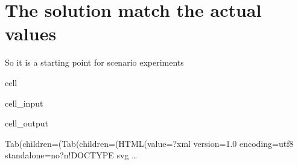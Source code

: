 \documentclass[letterpaper,10pt,english]{jupyterBook}
\begin{document}
\section{The solution match the actual values}
\label{\detokenize{content/howto/smallmodel/modelstart:the-solution-match-the-actual-values}}
\sphinxAtStartPar
So it is a starting point for scenario experiments

\begin{sphinxuseclass}{cell}\begin{sphinxVerbatimInput}

\begin{sphinxuseclass}{cell_input}
\begin{sphinxVerbatim}[commandchars=\\\{\}]
\PYG{p}{[}\PYG{p}{]} 
\end{sphinxVerbatim}

\end{sphinxuseclass}\end{sphinxVerbatimInput}
\begin{sphinxVerbatimOutput}

\begin{sphinxuseclass}{cell_output}
\begin{sphinxVerbatim}[commandchars=\\\{\}]
Tab(children=(Tab(children=(HTML(value=\PYGZsq{}\PYGZlt{}?xml version=\PYGZdq{}1.0\PYGZdq{} encoding=\PYGZdq{}utf\PYGZhy{}8\PYGZdq{} standalone=\PYGZdq{}no\PYGZdq{}?\PYGZgt{}\PYGZbs{}n\PYGZlt{}!DOCTYPE svg …
\end{sphinxVerbatim}

\begin{sphinxVerbatim}[commandchars=\\\{\}]

\end{sphinxVerbatim}

\end{sphinxuseclass}\end{sphinxVerbatimOutput}

\end{sphinxuseclass}
\end{document}
